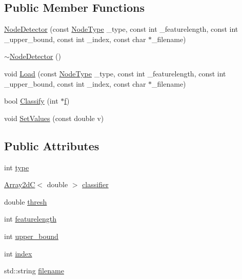 \subsection*{Public Member Functions}
\begin{DoxyCompactItemize}
\item 
\mbox{\hyperlink{class_node_detector_af6107c5f4f78e4d60a720733e6fbcb5e}{Node\+Detector}} (const \mbox{\hyperlink{class_node_detector_a7188c48dfe6b88b3b7f47c599c4832bd}{Node\+Type}} \+\_\+type, const int \+\_\+featurelength, const int \+\_\+upper\+\_\+bound, const int \+\_\+index, const char $\ast$\+\_\+filename)
\item 
\mbox{\hyperlink{class_node_detector_a3f8e6eedfce05ea8953ff1a41413ccfa}{$\sim$\+Node\+Detector}} ()
\item 
void \mbox{\hyperlink{class_node_detector_a8f28d4e33d23c0391511f795615b45d2}{Load}} (const \mbox{\hyperlink{class_node_detector_a7188c48dfe6b88b3b7f47c599c4832bd}{Node\+Type}} \+\_\+type, const int \+\_\+featurelength, const int \+\_\+upper\+\_\+bound, const int \+\_\+index, const char $\ast$\+\_\+filename)
\item 
bool \mbox{\hyperlink{class_node_detector_aa0fb033c9d770dda75236562784e9b88}{Classify}} (int $\ast$\mbox{\hyperlink{rings_8cpp_a77369fc4d5326a16d2c603e032023528}{f}})
\item 
void \mbox{\hyperlink{class_node_detector_a23a218ae9b613009bafcda85527a7dd7}{Set\+Values}} (const double v)
\end{DoxyCompactItemize}
\subsection*{Public Attributes}
\begin{DoxyCompactItemize}
\item 
int \mbox{\hyperlink{class_node_detector_a96a5ab514f7996e4e64fff8d37199f64}{type}}
\item 
\mbox{\hyperlink{class_array2d_c}{Array2dC}}$<$ double $>$ \mbox{\hyperlink{class_node_detector_a5eb3c12d3aa5250116334d6b4897ae47}{classifier}}
\item 
double \mbox{\hyperlink{class_node_detector_a2fd8792e80f3f31d2d07831a5169935f}{thresh}}
\item 
int \mbox{\hyperlink{class_node_detector_a3ebce10718457e7875c01dbe1eb77fa9}{featurelength}}
\item 
int \mbox{\hyperlink{class_node_detector_a904a3a37a99f506752794a979314548a}{upper\+\_\+bound}}
\item 
int \mbox{\hyperlink{class_node_detector_a6a5fa5a89be5d2fd96b983f6afdab214}{index}}
\item 
std\+::string \mbox{\hyperlink{class_node_detector_ab4412f3aad986ffcc56289f95934ace1}{filename}}
\end{DoxyCompactItemize}
